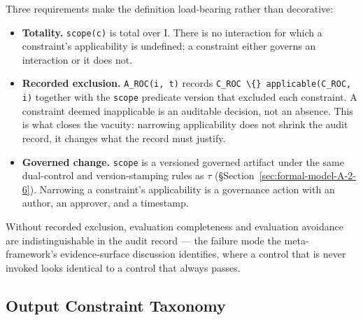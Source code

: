 Three requirements make the definition load-bearing rather than decorative:

\begin{itemize}
  \item \textbf{Totality.} \texttt{scope(c)} is total over I. There is no interaction for which a constraint's applicability is undefined; a constraint either governs an interaction or it does not.
  \item \textbf{Recorded exclusion.} \texttt{A\_\allowbreak{}ROC(i, t)} records \texttt{C\_\allowbreak{}ROC \textbackslash\{\} applicable(C\_\allowbreak{}ROC, i)} together with the \texttt{scope} predicate version that excluded each constraint. A constraint deemed inapplicable is an auditable decision, not an absence. This is what closes the vacuity: narrowing applicability does not shrink the audit record, it changes what the record must justify.
  \item \textbf{Governed change.} \texttt{scope} is a versioned governed artifact under the same dual-control and version-stamping rules as \texttt{$\tau$} (\S{}Section~\ref{sec:formal-model-A-2-6}). Narrowing a constraint's applicability is a governance action with an author, an approver, and a timestamp.
\end{itemize}


Without recorded exclusion, evaluation completeness and evaluation avoidance are
indistinguishable in the audit record --- the failure mode the meta-framework's
evidence-surface discussion identifies, where a control that is never invoked
looks identical to a control that always passes.

\subsection{Output Constraint Taxonomy}
\label{sec:formal-model-A-2-2}


